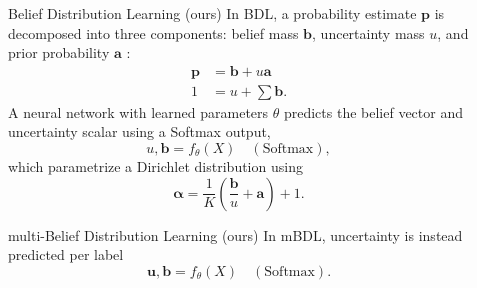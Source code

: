 \documentclass[final]{beamer}
\newlength{\sepwid}
\newlength{\sidewid}
\newlength{\midwid}
\newlength{\twocolwid}
\begin{document}
\begin{frame}
\begin{columns}[t]
\begin{column}{\sidewid}

\end{column} %

\begin{column}{\sepwid}\end{column} %

\begin{column}{\twocolwid} %

\begin{columns}[t,totalwidth=\twocolwid] %

\begin{column}{\midwid}\vspace{-.74in} %


\begin{exampleblock}{Belief Distribution Learning (ours)}
In BDL, a probability estimate $\mathbf{p}$ is decomposed into three components: belief mass $\mathbf{b}$, uncertainty mass $u$, and prior probability $\boldsymbol{a}$ \cite{josang_subjective_2016}:
\begin{align*}
    \mathbf{p} &= \mathbf{b} + u\boldsymbol{a} \\
    1 &= u + \sum \mathbf{b}.
\end{align*}
A neural network with learned parameters $\hat\theta$ predicts the belief vector and uncertainty scalar using a Softmax output,
\begin{equation*}
    u, \mathbf{b} = f_\theta(X) \quad (\text{Softmax}),
\end{equation*}
which parametrize a Dirichlet distribution using
\begin{equation*}
    \boldsymbol{\alpha} = \frac{1}{K}\left(\frac{\mathbf{b}}{u} + \mathbf{a}\right) + 1.
\end{equation*}
\end{exampleblock}

\begin{exampleblock}{multi-Belief Distribution Learning (ours)}
In mBDL, uncertainty is instead predicted per label
\begin{equation*}
    \mathbf{u}, \mathbf{b} = f_\theta(X) \quad (\text{Softmax}).
\end{equation*}


\end{exampleblock}
\end{column}
\end{columns}
\end{column}
\end{columns}
\end{frame}
\end{document}
